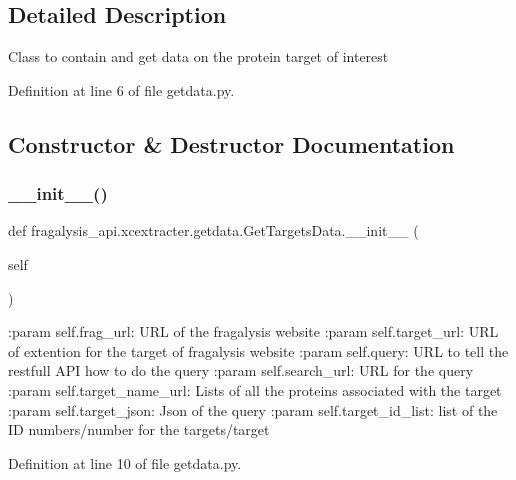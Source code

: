 \subsection{Detailed Description}
\begin{DoxyVerb}Class to contain and get data on the protein target of interest
\end{DoxyVerb}
 

Definition at line 6 of file getdata.\+py.



\subsection{Constructor \& Destructor Documentation}
\mbox{\label{classfragalysis__api_1_1xcextracter_1_1getdata_1_1_get_targets_data_a40260f1d84f75c354f8b1b7124732b3a}} 
\subsubsection{\texorpdfstring{\+\_\+\+\_\+init\+\_\+\+\_\+()}{\_\_init\_\_()}}
{\footnotesize\ttfamily def fragalysis\+\_\+api.\+xcextracter.\+getdata.\+Get\+Targets\+Data.\+\_\+\+\_\+init\+\_\+\+\_\+ (\begin{DoxyParamCaption}\item[{}]{self }\end{DoxyParamCaption})}

\begin{DoxyVerb}:param self.frag_url: URL of the fragalysis website
:param self.target_url: URL of extention for the target of fragalysis website
:param self.query: URL to tell the restfull API how to do the query
:param self.search_url: URL for the query 
:param self.target_name_url: Lists of all the proteins associated with the target
:param self.target_json: Json of the query
:param self.target_id_list: list of the ID numbers/number for the targets/target
\end{DoxyVerb}
 

Definition at line 10 of file getdata.\+py.



